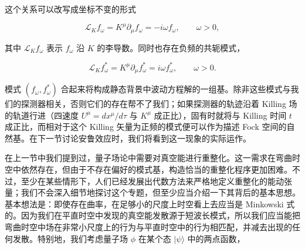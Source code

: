 这个关系可以改写成坐标不变的形式

\begin{equation*}
\mathcal{L}_K f_{\omega} = K^{\mu}\partial_{\mu}f_{\omega} = -i\omega f_{\omega}, \qquad \omega > 0,
\tag{9.118}
\end{equation*}

其中 $\mathcal{L}_K f_{\omega}$ 表示 $f_{\omega}$ 沿 $K$ 的李导数。同时也存在负频的共轭模式，

\begin{equation*}
\mathcal{L}_K f^{*}_{\omega} = K^{\mu}\partial_{\mu}f^{*}_{\omega} = i\omega f^{*}_{\omega}, \qquad \omega > 0.
\tag{9.119}
\end{equation*}

模式 $(f_{\omega}, f^{*}_{\omega})$ 合起来将构成静态背景中波动方程解的一组基。除非这些模式与我们的探测器相关，否则它们的存在帮不了我们；如果探测器的轨迹沿着 Killing 场的轨道行进（四速度 $U^{\mu} = dx^{\mu}/d\tau$ 与 $K^{\mu}$ 成正比），固有时就将与 Killing 时间 $t$ 成正比，而相对于这个 Killing 矢量为正频的模式便可以作为描述 Fock 空间的自然基。在下一节讨论安鲁效应时，我们将看到这一现象的实际运作。

在上一节中我们提到过，量子场论中需要对真空能进行重整化。这一需求在弯曲时空中依然存在，但由于不存在偏好的模式基，构造恰当的重整化程序更加困难。不过，至少在某些情形下，人们已经发展出代数方法来严格地定义重整化的能动张量；我们不会深入细节地探讨这个专题，但至少应当介绍一下其背后的基本思想。基本想法是：即使存在曲率，在足够小的尺度上时空看上去应当是 Minkowski 式的。因为我们在平直时空中发现的真空能发散源于短波长模式，所以我们应当能把弯曲时空中场在非常小尺度上的行为与平直时空中的行为相匹配，并减去出现的任何发散。特别地，我们考虑量子场 $\phi$ 在某个态 $|\psi\rangle$ 中的两点函数，
